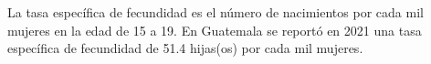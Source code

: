 La tasa específica de fecundidad es el número de nacimientos por cada mil mujeres en la edad de 15 a 19. En Guatemala se reportó en 2021 una tasa específica de fecundidad de 51.4 hijas(os) por cada mil mujeres.
